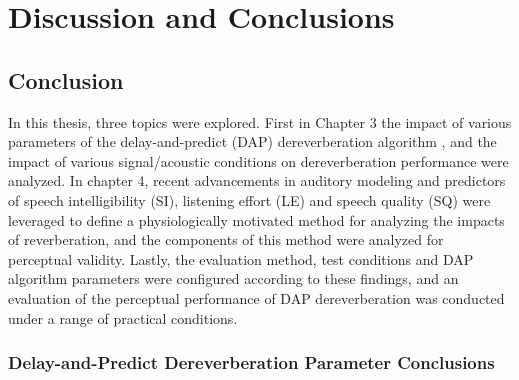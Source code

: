 \chapter{Discussion and Conclusions}

\section{Conclusion}


In this thesis, three topics were explored. First in Chapter 3 the impact of various parameters of the delay-and-predict (DAP) dereverberation algorithm \citep{triki2006delay}, and the impact of various signal/acoustic conditions on dereverberation performance were analyzed. In chapter 4, recent advancements in auditory modeling and predictors of speech intelligibility (SI), listening effort (LE) and speech quality (SQ) were leveraged to define a physiologically motivated method for analyzing the impacts of reverberation, and the components of this method were analyzed for perceptual validity. Lastly, the evaluation method, test conditions and DAP algorithm parameters were configured according to these findings, and an evaluation of the perceptual performance of DAP dereverberation was conducted under a range of practical conditions.

\subsection{Delay-and-Predict Dereverberation Parameter Conclusions}

